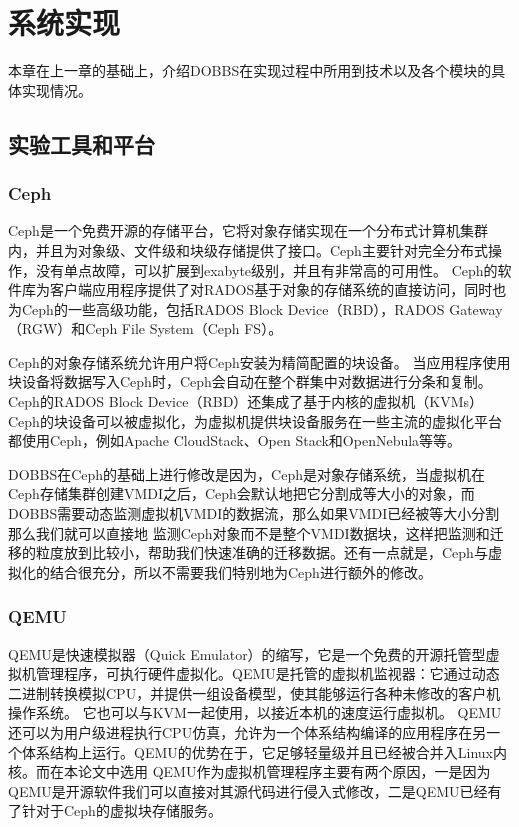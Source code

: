 
\chapter{系统实现}
\label{chap:systemimpl}
本章在上一章的基础上，介绍DOBBS在实现过程中所用到技术以及各个模块的具体实现情况。

\section{实验工具和平台}
\subsection{Ceph}
Ceph是一个免费开源的存储平台，它将对象存储实现在一个分布式计算机集群内，并且为对象级、文件级和块级存储提供了接口。Ceph主要针对完全分布式操作，没有单点故障，可以扩展到exabyte级别，并且有非常高的可用性。
Ceph的软件库为客户端应用程序提供了对RADOS基于对象的存储系统的直接访问，同时也为Ceph的一些高级功能，包括RADOS Block Device（RBD），RADOS Gateway（RGW）和Ceph File System（Ceph FS）。

Ceph的对象存储系统允许用户将Ceph安装为精简配置的块设备。 当应用程序使用块设备将数据写入Ceph时，Ceph会自动在整个群集中对数据进行分条和复制。 Ceph的RADOS Block Device（RBD）还集成了基于内核的虚拟机（KVMs）
Ceph的块设备可以被虚拟化，为虚拟机提供块设备服务在一些主流的虚拟化平台都使用Ceph，例如Apache CloudStack、Open Stack和OpenNebula等等。

DOBBS在Ceph的基础上进行修改是因为，Ceph是对象存储系统，当虚拟机在Ceph存储集群创建VMDI之后，Ceph会默认地把它分割成等大小的对象，而DOBBS需要动态监测虚拟机VMDI的数据流，那么如果VMDI已经被等大小分割那么我们就可以直接地
监测Ceph对象而不是整个VMDI数据块，这样把监测和迁移的粒度放到比较小，帮助我们快速准确的迁移数据。还有一点就是，Ceph与虚拟化的结合很充分，所以不需要我们特别地为Ceph进行额外的修改。

\subsection{QEMU}
QEMU是快速模拟器（Quick Emulator）的缩写，它是一个免费的开源托管型虚拟机管理程序，可执行硬件虚拟化。QEMU是托管的虚拟机监视器：它通过动态二进制转换模拟CPU，并提供一组设备模型，使其能够运行各种未修改的客户机操作系统。 
它也可以与KVM一起使用，以接近本机的速度运行虚拟机。 QEMU还可以为用户级进程执行CPU仿真，允许为一个体系结构编译的应用程序在另一个体系结构上运行。QEMU的优势在于，它足够轻量级并且已经被合并入Linux内核。而在本论文中选用
QEMU作为虚拟机管理程序主要有两个原因，一是因为QEMU是开源软件我们可以直接对其源代码进行侵入式修改，二是QEMU已经有了针对于Ceph的虚拟块存储服务。


